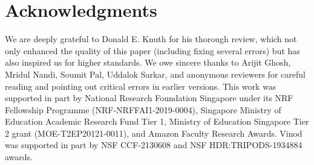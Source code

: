 \documentclass[a4paper,UKenglish,cleveref, autoref, thm-restate]{lipics-v2021}
\begin{document}
\section*{Acknowledgments}
We are deeply grateful to Donald E. Knuth for his thorough review, which not only enhanced the quality of this paper (including fixing several errors) but has also inspired us for higher standards. 
We owe sincere thanks to Arijit Ghosh, Mridul Nandi, Soumit Pal, Uddalok Sarkar, and anonymous reviewers for careful reading and pointing out critical errors in earlier versions. 
This work was supported in part by National Research Foundation Singapore under its NRF Fellowship Programme (NRF-NRFFAI1-2019-0004), Singapore Ministry of Education Academic Research Fund Tier 1, Ministry of Education Singapore Tier 2 grant (MOE-T2EP20121-0011),  and Amazon Faculty Research Awards.  Vinod was supported in part by NSF CCF-2130608 and NSF HDR:TRIPODS-1934884 awards. 
\end{document}

